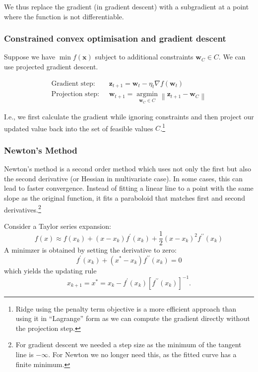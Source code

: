 \documentclass[11pt, %
	oneside, %
	english, %
	onehalfspacing, %
	parskip, %
	]{article} %
\theoremstyle{definition}
\begin{document}
We thus replace the gradient (in gradient descent) with a subgradient at a point where the function is not differentiable.

\subsubsection*{Constrained convex optimisation and gradient descent}

Suppose we have $\min f(\mathbf{x})$ subject to additional constraints $\mathbf{w}_C \in C$. We can use projected gradient descent.

$$
\begin{aligned}
\text{Gradient step: } \; &\mathbf{z}_{t+1}  =\mathbf{w}_t-\eta_t \nabla f\left(\mathbf{w}_t\right) \\
\text{Projection step: } \; &\mathbf{w}_{t+1}  =\underset{\mathbf{w}_C \in C}{\operatorname{argmin}}\left\|\mathbf{z}_{t+1}-\mathbf{w}_C\right\|
\end{aligned}
$$

I.e., we first calculate the gradient while ignoring constraints and then project our updated value back into the set of feasible values $C$.\footnote{Ridge using the penalty term objective is a more efficient approach than using it in ``Lagrange'' form as we can compute the gradient directly without the projection step.}

\subsubsection*{Newton's Method}

Newton's method is a second order method which uses not only the first but also the second derivative (or Hessian in multivariate case). In some cases, this can lead to faster convergence. Instead of fitting a linear line to a point with the same slope as the original function, it fits a paraboloid that matches first and second derivatives.\footnote{For gradient descent we needed a step size as the minimum of the tangent line is $-\infty$. For Newton we no longer need this, as the fitted curve has a finite minimum.}

Consider a Taylor series expansion:
\begin{equation*}
	f(x) \approx f\left(x_k\right)+\left(x-x_k\right) f^{\prime}\left(x_k\right)+\frac{1}{2}\left(x-x_k\right)^2 f^{\prime \prime}\left(x_k\right)
\end{equation*}
A minimzer is obtained by setting the derivative to zero:
\begin{equation*}
	f^{\prime}\left(x_k\right)+\left(x^*-x_k\right) f^{\prime \prime}\left(x_k\right) = 0
\end{equation*}
which yields the updating rule
\begin{equation*}
	x_{k+1}=x^*=x_k-f^{\prime}\left(x_k\right)\left[f^{\prime \prime}\left(x_k\right)\right]^{-1}.
\end{equation*}
\end{document}
